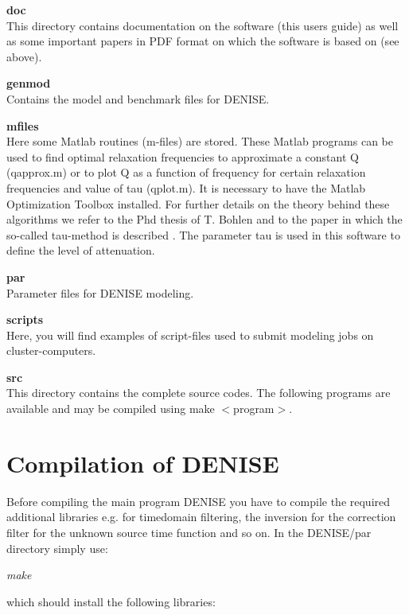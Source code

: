 \textbf{doc}\\
This directory contains documentation on the software (this users guide) as well as some important papers in PDF format on which the software is based on (see above).

\textbf{genmod}\\
Contains the model and benchmark files for DENISE.

\textbf{mfiles}\\
Here some Matlab routines (m-files) are stored. These Matlab programs can be used to find optimal relaxation frequencies to approximate a constant Q (qapprox.m) or to plot Q as a function of frequency for certain relaxation frequencies and value of tau (qplot.m). It is necessary to have the Matlab Optimization Toolbox installed. For further details on the theory behind these algorithms we refer to the Phd thesis of T. Bohlen \cite{bohlen:98} and to the paper in which the so-called tau-method is described \cite{blanch:95}. The parameter tau is used in this software to define the level of attenuation.

\textbf{par}\\
Parameter files for DENISE modeling.

\textbf{scripts}\\
Here, you will find examples of script-files used to submit modeling jobs on cluster-computers.

\textbf{src}\\
This directory contains the complete source codes.  The following programs are available and may be compiled using make $<$program$>$.


\section{Compilation of DENISE}\label{compexec}
Before compiling the main program DENISE you have to compile the required additional libraries e.g. for timedomain filtering, the inversion for the correction filter for the unknown source time function and so on. In the DENISE/par directory simply use:
\newline

\textit{make}
\newline


which should install the following libraries:

